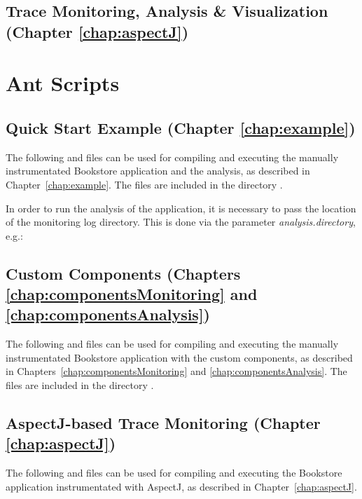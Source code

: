	\subsection{Trace Monitoring, Analysis \& Visualization (Chapter \ref{chap:aspectJ})}
		
	
\newpage
  \section{Ant Scripts}
    \subsection{Quick Start Example (Chapter \ref{chap:example})}
The following  and  files can be %
used for compiling and executing the manually instrumentated Bookstore %
application and the analysis, as described in Chapter~\ref{chap:example}. %
The files are included in the directory \file{\manualInstrumentedBookstoreApplicationDirDistro{}/}.

      In order to run the analysis of the application, it is necessary to pass the location of the monitoring log directory. This is done via the parameter \textit{analysis.directory}, e.g.:
      \setBashListing
      

\enlargethispage{1.2cm}
      \setXMLListing
      
      
\newpage
    \subsection{Custom Components (Chapters \ref{chap:componentsMonitoring} and \ref{chap:componentsAnalysis})}
      The following  and  files can be used for compiling and executing the manually instrumentated Bookstore application with the custom components, as described in Chapters~\ref{chap:componentsMonitoring} and \ref{chap:componentsAnalysis}. %
The files are included in the directory \file{\customComponentsBookstoreApplicationDirDistro{}/}.
      \setXMLListing
      
      
\newpage
    \subsection{AspectJ-based Trace Monitoring (Chapter \ref{chap:aspectJ})}
      The following  and  files can be used for compiling and executing the Bookstore application instrumentated with AspectJ, as described in Chapter~\ref{chap:aspectJ}. %

